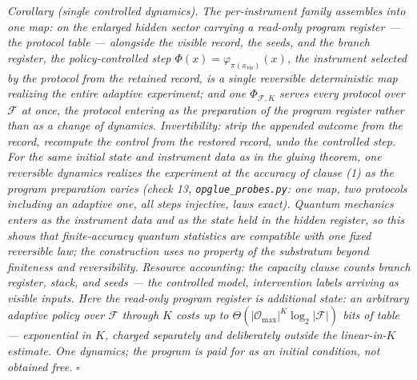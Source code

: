 \documentclass[
]{article}
\begin{document}
\emph{Corollary (single controlled dynamics).} \emph{The per-instrument
family assembles into one map: on the enlarged hidden sector carrying a
read-only program register --- the protocol table --- alongside the
visible record, the seeds, and the branch register, the
policy-controlled step \(\Phi(x) = \varphi_{\pi(x_{\mathrm{vis}})}(x)\),
the instrument selected by the protocol from the retained record, is a
single reversible deterministic map realizing the entire adaptive
experiment; and one \(\Phi_{\mathcal{F},K}\) serves every protocol over
\(\mathcal{F}\) at once, the protocol entering as the preparation of the
program register rather than as a change of dynamics. Invertibility:
strip the appended outcome from the record, recompute the control from
the restored record, undo the controlled step. For the same initial
state and instrument data as in the gluing theorem, one reversible
dynamics realizes the experiment at the accuracy of clause (1) as the
program preparation varies (check 13, \texttt{opglue\_probes.py}: one
map, two protocols including an adaptive one, all steps injective, laws
exact). Quantum mechanics enters as the instrument data and as the state
held in the hidden register, so this shows that finite-accuracy quantum
statistics are compatible with one fixed reversible law; the
construction uses no property of the substratum beyond finiteness and
reversibility.} \emph{Resource accounting: the capacity clause counts
branch register, stack, and seeds --- the controlled model, intervention
labels arriving as visible inputs. Here the read-only program register
is additional state: an arbitrary adaptive policy over \(\mathcal{F}\)
through \(K\) costs up to
\(\Theta(|\mathcal{O}_{\max}|^{K} \log_2|\mathcal{F}|)\) bits of table
--- exponential in \(K\), charged separately and deliberately outside
the linear-in-\(K\) estimate. One dynamics; the program is paid for as
an initial condition, not obtained free.} \(\square\)
\end{document}
